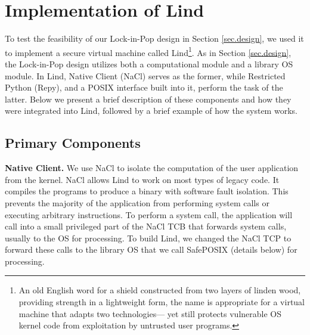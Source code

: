 \section{Implementation of Lind}
\label{sec.implementation}

To test the feasibility of our Lock-in-Pop design in
Section \ref{sec.design}, we used it to implement a secure virtual machine
called Lind\footnote{\scriptsize An old English word for a shield constructed from two layers of
linden wood, providing strength in a lightweight form, the name is appropriate for
a virtual machine that adapts two technologies—\textendash
yet still protects vulnerable OS kernel code from exploitation by
untrusted user programs.}. 
%
As in Section \ref{sec.design}, the Lock-in-Pop design utilizes both a
computational module and a library OS module. In Lind, Native Client (NaCl) serves as the former,
while Restricted Python (Repy), and a POSIX interface built into it, perform the task of the latter.
Below we present a brief description of these components and how they were integrated
into Lind, followed by a brief example of how the system works.

\subsection{Primary Components}

\textbf{Native Client.}
We use NaCl to isolate the computation of the user application
from the kernel. NaCl allows Lind to work on most types of legacy code.
It compiles the programs to produce a binary with software fault isolation.
This prevents the majority of the application from performing system calls
or executing arbitrary instructions.
%
To perform a system call, the application will call into a small privileged
part of the NaCl TCB that forwards system calls, usually to the OS for
processing. To build Lind, we changed the NaCl TCP to
forward these calls to the library OS that we call SafePOSIX (details below)
for processing.

